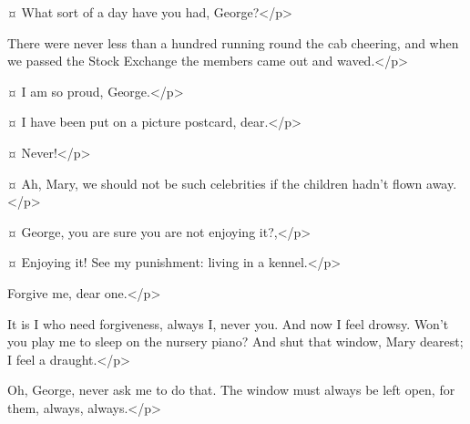 \begin{drama}
\mrsdarlingspeaks {}¤
What sort of a day have you had, George?</p>


\mrdarlingspeaks
There were never less than a hundred running round the cab cheering, and when we passed the Stock Exchange the members came out and waved.</p>


\mrsdarlingspeaks {}¤
I am so proud, George.</p>

\mrdarlingspeaks {}¤
I have been put on a picture postcard, dear.</p>

\mrsdarlingspeaks {}¤
Never!</p>

\mrdarlingspeaks {}¤
Ah, Mary, we should not be such celebrities if the children hadn't flown away.</p>

\mrsdarlingspeaks {}¤
George, you are sure you are not enjoying it?,</p>

\mrdarlingspeaks {}¤
Enjoying it! See my punishment: living in a kennel.</p>

\mrsdarlingspeaks
Forgive me, dear one.</p>

\mrdarlingspeaks
It is I who need forgiveness, always I, never you. And now I feel drowsy.
Won't you play me to sleep on the nursery piano? And shut that window, Mary dearest; I feel a draught.</p>

\mrsdarlingspeaks
Oh, George, never ask me to do that. The window must always be left open, for them, always, always.</p>



\end{drama}
